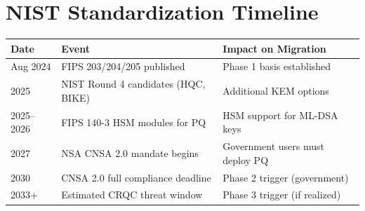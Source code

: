 \section{NIST Standardization Timeline}


\begin{center}
\begin{tabular}{lll}
\toprule
\textbf{Date} & \textbf{Event} & \textbf{Impact on Migration} \\
\midrule
Aug 2024 & FIPS 203/204/205 published & Phase 1 basis established \\
2025 & NIST Round 4 candidates (HQC, BIKE) & Additional KEM options \\
2025--2026 & FIPS 140-3 HSM modules for PQ & HSM support for ML-DSA keys \\
2027 & NSA CNSA 2.0 mandate begins & Government users must deploy PQ \\
2030 & CNSA 2.0 full compliance deadline & Phase 2 trigger (government) \\
2033+ & Estimated CRQC threat window & Phase 3 trigger (if realized) \\
\bottomrule
\end{tabular}
\end{center}

